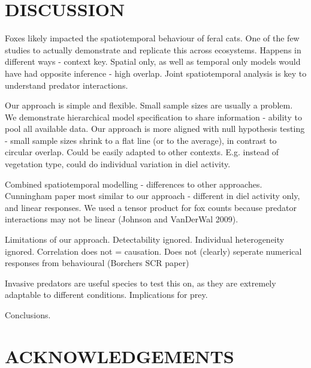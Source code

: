 \documentclass[]{elsarticle} %
\begin{document}
\newpage

\hypertarget{discussion}{%
\section{DISCUSSION}\label{discussion}}

Foxes likely impacted the spatiotemporal behaviour of feral cats. One of the few studies to actually demonstrate and replicate this across ecosystems.
Happens in different ways - context key. Spatial only, as well as temporal only models would have had opposite inference - high overlap. Joint spatiotemporal analysis is key to understand predator interactions.

Our approach is simple and flexible.
Small sample sizes are usually a problem. We demonstrate hierarchical model specification to share information - ability to pool all available data.
Our approach is more aligned with null hypothesis testing - small sample sizes shrink to a flat line (or to the average), in contrast to circular overlap.
Could be easily adapted to other contexts. E.g. instead of vegetation type, could do individual variation in diel activity.

Combined spatiotemporal modelling - differences to other approaches.
Cunningham paper most similar to our approach - different in diel activity only, and linear responses.
We used a tensor product for fox counts because predator interactions may not be linear (Johnson and VanDerWal 2009).

Limitations of our approach.
Detectability ignored.
Individual heterogeneity ignored.
Correlation does not = causation.
Does not (clearly) seperate numerical responses from behavioural (Borchers SCR paper)

Invasive predators are useful species to test this on, as they are extremely adaptable to different conditions.
Implications for prey.

Conclusions.

\newpage

\hypertarget{acknowledgements}{%
\section{ACKNOWLEDGEMENTS}\label{acknowledgements}}
\end{document}

